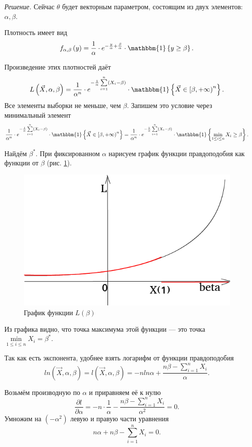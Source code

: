 \textit{Решение.}
Сейчас $ \theta $ будет векторным параметром, состоящим из двух элементов: $ \alpha, \beta $.

Плотность имеет вид
$$f_{ \alpha, \beta } \left( y \right) =
  \frac{1}{ \alpha } \cdot
  e^{- \frac{y}{ \alpha } + \frac{ \beta }{ \alpha }} \cdot
  \mathbbm{1} \left\{ y \geq \beta \right\}.$$

Произведение этих плотностей даёт
$$L \left( \vec{X}, \alpha, \beta \right) =
  \frac{1}{ \alpha^n} \cdot
  e^{- \frac{1}{ \alpha } \sum \limits_{i = 1}^n \left( X_i - \beta \right) } \cdot
  \mathbbm{1} \left\{ \vec{X} \in \left[ \beta, + \infty \right)^n \right\}.$$
Все элементы выборки не меньше, чем $ \beta $.
Запишем это условие через минимальный элемент
$$ \frac{1}{ \alpha^n} \cdot
  e^{- \frac{1}{ \alpha } \sum \limits_{i = 1}^n \left( X_i - \beta \right) } \cdot
  \mathbbm{1} \left\{ \vec{X} \in \left[ \beta, + \infty \right)^n \right\} =
  \frac{1}{ \alpha^n} \cdot
  e^{- \frac{1}{ \alpha } \sum \limits_{i = 1}^n \left( X_i - \beta \right) }
  \cdot \mathbbm{1} \left\{ \min \limits_{1 \leq i \leq n} X_i \geq \beta \right\}.$$

Найдём $ \beta^*$.
При фиксированном $ \alpha $ нарисуем график функции правдоподобия как функции от $ \beta $
(рис. \ref{fig:419}).

\begin{figure}[h!]
  \centering
  \includegraphics[width=.4\textwidth]{./pictures/4_19.png}
  \caption{График функции $L \left( \beta \right) $}
  \label{fig:419}
\end{figure}

Из графика видно, что точка максимума этой функции ---
это точка $ \min \limits_{1 \leq i \leq n} X_i = \beta^*$.

Так как есть экспонента, удобнее взять логарифм от функции правдоподобия
$$ln \left( \vec{X}, \alpha, \beta \right) =
  l \left( \vec{X}, \alpha, \beta \right) =
  -n ln \alpha + \frac{n \beta - \sum \limits_{i = 1}^n X_i}{ \alpha }.$$

Возьмём производную по $ \alpha $ и приравняем её к нулю
$$ \frac{ \partial l}{ \partial \alpha } =
  -n \cdot \frac{1}{ \alpha } - \frac{n \beta - \sum \limits_{i = 1}^n X_i}{ \alpha^2} =
  0.$$
Умножим на $ \left( - \alpha^2 \right) $ левую и правую части уравнения
$$n \alpha + n \beta - \sum \limits_{i = 1}^n X_i =
  0.$$

